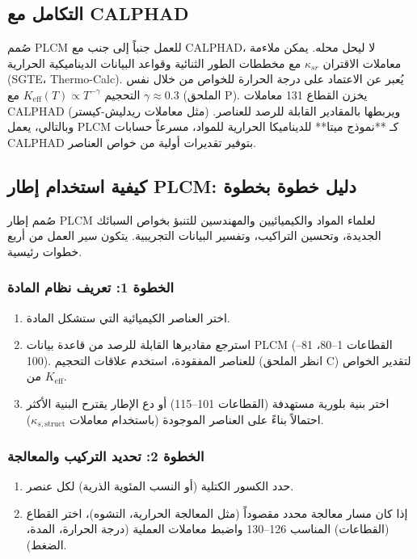 \documentclass[11pt,a4paper]{article}
\newcommand{\Keff}{K_{\mathrm{eff}}}
\begin{document}
\begin{otherlanguage}{arabic}
		\section{التكامل مع CALPHAD}
		
		صُمم PLCM للعمل جنباً إلى جنب مع CALPHAD، لا ليحل محله. يمكن ملاءمة معاملات الاقتران \(\kappa_{sr}\) مع مخططات الطور الثنائية وقواعد البيانات الديناميكية الحرارية (SGTE، Thermo-Calc). يُعبر عن الاعتماد على درجة الحرارة للخواص من خلال نفس التحجيم \(\Keff(T) \propto T^{-\gamma}\) مع \(\gamma \approx 0.3\) (الملحق P). يخزن القطاع 131 معاملات CALPHAD (مثل معاملات ريدليش-كيستر) ويربطها بالمقادير القابلة للرصد للعناصر. وبالتالي، يعمل PLCM كـ **نموذج ميتا** للديناميكا الحرارية للمواد، مسرعاً حسابات CALPHAD بتوفير تقديرات أولية من خواص العناصر.
		
		\subsection{كيفية استخدام إطار PLCM: دليل خطوة بخطوة}
		
		صُمم إطار PLCM لعلماء المواد والكيميائيين والمهندسين للتنبؤ بخواص السبائك الجديدة، وتحسين التراكيب، وتفسير البيانات التجريبية. يتكون سير العمل من أربع خطوات رئيسية.
		
		\subsubsection{الخطوة 1: تعريف نظام المادة}
		
		\begin{enumerate}
			\item اختر العناصر الكيميائية التي ستشكل المادة.
			\item استرجع مقاديرها القابلة للرصد من قاعدة بيانات PLCM (القطاعات 1–80، 81–100). للعناصر المفقودة، استخدم علاقات التحجيم (انظر الملحق C) لتقدير الخواص من \(\Keff\).
			\item اختر بنية بلورية مستهدفة (القطاعات 101–115) أو دع الإطار يقترح البنية الأكثر احتمالاً بناءً على العناصر الموجودة (باستخدام معاملات \(\kappa_{s,\text{struct}}\)).
		\end{enumerate}
		
		\subsubsection{الخطوة 2: تحديد التركيب والمعالجة}
		
		\begin{enumerate}
			\item حدد الكسور الكتلية (أو النسب المئوية الذرية) لكل عنصر.
			\item إذا كان مسار معالجة محدد مقصوداً (مثل المعالجة الحرارية، التشوه)، اختر القطاع (القطاعات) المناسب 126–130 واضبط معاملات العملية (درجة الحرارة، المدة، الضغط).
		\end{enumerate}
		

\end{otherlanguage}
\end{document}
